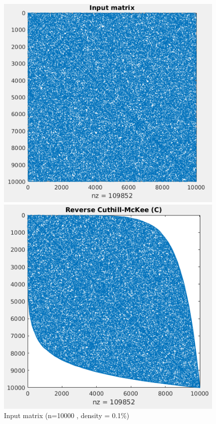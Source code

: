 \documentclass[letterpaper,12pt]{article}
\begin{document}
\begin{figure}[!htb]
	\begin{minipage}[b]{0.32\textwidth}
		\includegraphics[width=\textwidth]{images/input.png}
		\caption{Input matrix (n=10000 , density = 0.1\%)}
		\label{fig:input}
	\end{minipage}
	\hfill
	\begin{minipage}[b]{0.32\textwidth}
		\includegraphics[width=\textwidth]{images/out_c.png}

\end{minipage}
\end{figure}
\end{document}
